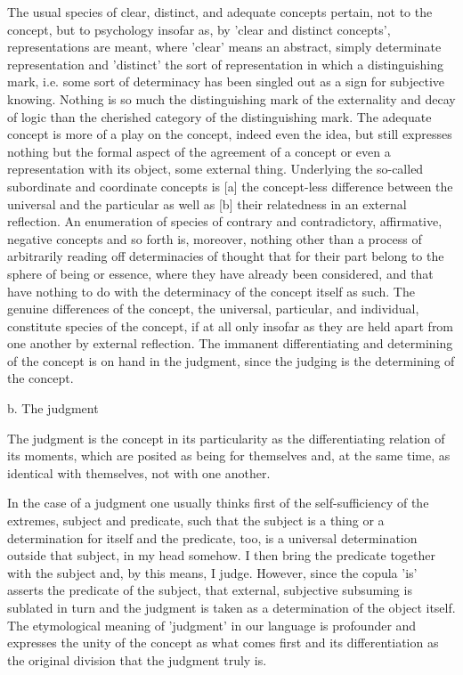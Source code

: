 The usual species of clear, distinct, and adequate concepts pertain,
not to the concept, but to psychology insofar as,
by 'clear and distinct concepts', representations are meant,
where 'clear' means an abstract, simply determinate representation
and 'distinct' the sort of representation in which
a distinguishing mark, i.e. some sort of determinacy
has been singled out as a sign for subjective knowing.
Nothing is so much the distinguishing mark of
the externality and decay of logic
than the cherished category of the distinguishing mark.
The adequate concept is more of
a play on the concept, indeed even the idea,
but still expresses nothing but the formal aspect of
the agreement of a concept or even a representation
with its object, some external thing.
Underlying the so-called subordinate and coordinate concepts is
[a] the concept-less difference between the universal and the particular
as well as [b] their relatedness in an external reflection.
An enumeration of species of contrary and contradictory,
affirmative, negative concepts and so forth is, moreover,
nothing other than a process of arbitrarily reading off
determinacies of thought that for their part belong to
the sphere of being or essence,
where they have already been considered,
and that have nothing to do
with the determinacy of the concept itself as such.
The genuine differences of the concept,
the universal, particular, and individual,
constitute species of the concept,
if at all only insofar as they are held apart
from one another by external reflection.
The immanent differentiating and determining of
the concept is on hand in the judgment,
since the judging is the determining of the concept.

b. The judgment

The judgment is the concept in its particularity as
the differentiating relation of its moments,
which are posited as being for themselves
and, at the same time, as identical with themselves,
not with one another.

In the case of a judgment one usually thinks first of
the self-sufficiency of the extremes, subject and predicate,
such that the subject is a thing or a determination for itself
and the predicate, too, is a universal determination
outside that subject, in my head somehow.
I then bring the predicate together with the subject
and, by this means, I judge.
However, since the copula 'is' asserts the predicate of the subject,
that external, subjective subsuming is sublated in turn
and the judgment is taken as a determination of the object itself.
The etymological meaning of 'judgment' in our language is
profounder and expresses the unity of the concept
as what comes first and its differentiation
as the original division that the judgment truly is.

